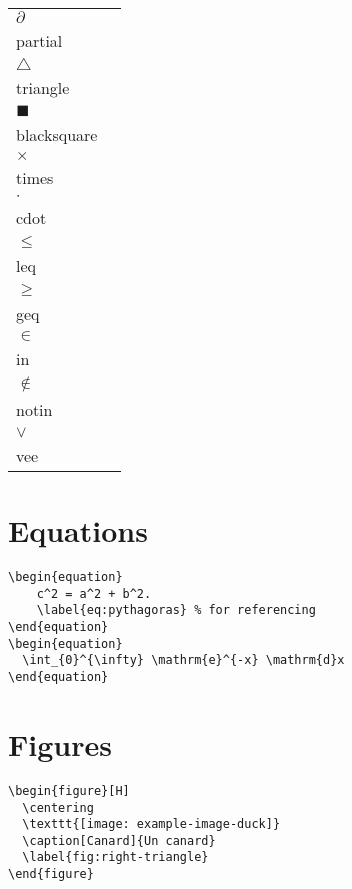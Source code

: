 \documentclass{article}
\begin{document}
\begin{multicols*}{3}
\begin{multicols*}{2}
\begin{tabularx}{\columnwidth}{lX}
    $\partial$ & \lstinline{\\partial} \\
    $\triangle$ & \lstinline{\\triangle} \\
    $\blacksquare$ & \lstinline{\\blacksquare} \\
    $\times$ & \lstinline{\\times} \\
    $\cdot$ & \lstinline{\\cdot} \\
    $\leq$ & \lstinline{\\leq} \\
    $\geq$ & \lstinline{\\geq} \\
    $\in$ & \lstinline{\\in} \\
    $\notin$ & \lstinline{\\notin} \\
    $\vee$ & \lstinline{\\vee} \\
\end{tabularx}

\end{multicols*}

\section*{Equations}

\begin{lstlisting}
\begin{equation}
    c^2 = a^2 + b^2.
    \label{eq:pythagoras} % for referencing
\end{equation}
\begin{equation}
  \int_{0}^{\infty} \mathrm{e}^{-x} \mathrm{d}x
\end{equation}

\end{lstlisting}

\section*{Figures}

\begin{multicols*}{2}


\begin{lstlisting}
\begin{figure}[H]
  \centering
  \texttt{[image: example-image-duck]}
  \caption[Canard]{Un canard}
  \label{fig:right-triangle}
\end{figure}
\end{lstlisting}


\end{multicols*}
\end{multicols*}
\end{document}
